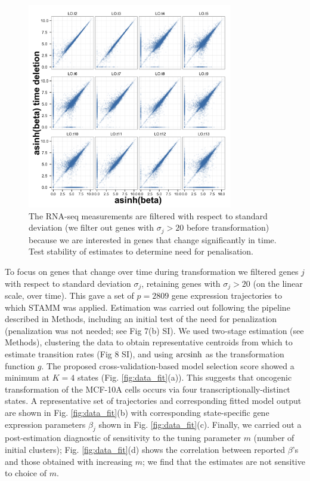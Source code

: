\begin{figure}
  \centering
  \includegraphics[width=0.8\textwidth]{pics/no-pen-data.png}
  \caption{The RNA-seq measurements are filtered with respect to standard deviation (we filter out genes with $\sigma_j > 20$ before transformation) because we are interested in genes that change significantly in time. Test stability of estimates to determine need for penalisation.}
  \label{fig:data-pen}
\end{figure}

To focus 
on genes that change over time  during transformation we filtered  genes $j$ with respect to 
 standard deviation $\sigma_j$, retaining genes with $\sigma_j > 20$ (on the linear scale, over time). 
This gave a set of $p=2809$ gene expression trajectories to which STAMM was applied. 
Estimation was carried out 
following the  pipeline described in Methods, including 
an initial test of the need for penalization (penalization was not needed; see Fig 7(b) SI). 
We used  two-stage estimation (see Methods), 
clustering the data 
to obtain representative centroids from which to estimate transition rates (Fig 8 SI), and using $\operatorname{arcsinh}$
as the transformation function $g$. 
The proposed cross-validation-based model selection score showed a minimum at $K=4$ states (Fig. \ref{fig:data_fit}(a)).
This suggests that oncogenic transformation of the MCF-10A cells occurs via four transcriptionally-distinct states. A representative set of trajectories and corresponding fitted model output are shown in Fig. \ref{fig:data_fit}(b) with corresponding 
state-specific gene expression parameters $\beta_j$ shown in Fig. \ref{fig:data_fit}(c).
Finally, we carried out a post-estimation diagnostic of sensitivity to the tuning parameter $m$ (number of initial clusters);
Fig. \ref{fig:data_fit}(d) shows the correlation between reported $\beta$'s and those obtained with increasing $m$; we find that the estimates are not sensitive to choice of $m$.


